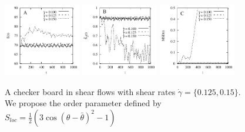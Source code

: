 \documentclass[aps,prl,preprint,groupedaddress]{revtex4-2}
\begin{document}
\begin{figure}
  \begin{center}
  \includegraphics[width=0.3\textwidth]{CS_E.pdf}
   \includegraphics[width=0.3\textwidth]{CS_LOP.pdf}
    \includegraphics[width=0.3\textwidth]{CS_MSD.pdf}
  \end{center}
\caption{A checker board in shear flows with shear rates $\dot\gamma=\{0.125, 0.15\}$. We propose the order parameter defined by $S_{loc} = \frac12(3\cos(\theta-\bar\theta)^2-1)$}
\end{figure}
\end{document}
